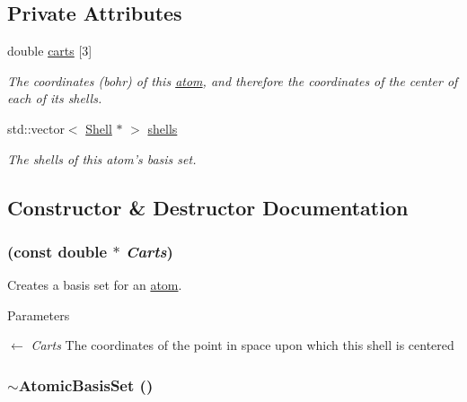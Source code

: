 \subsection*{Private Attributes}
\begin{DoxyCompactItemize}
\item 
double \hyperlink{classJKBuilder_1_1AtomicBasisSet_a6b5adb6f3635311b52c7a7a35dcb01b4}{carts} \mbox{[}3\mbox{]}
\begin{DoxyCompactList}\small\item\em The coordinates (bohr) of this \hyperlink{classJKBuilder_1_1atom}{atom}, and therefore the coordinates of the center of each of its shells. \item\end{DoxyCompactList}\item 
std::vector$<$ \hyperlink{classJKBuilder_1_1Shell}{Shell} $\ast$ $>$ \hyperlink{classJKBuilder_1_1AtomicBasisSet_a26a4de72845629b10ccfa84bf3b27790}{shells}
\begin{DoxyCompactList}\small\item\em The shells of this atom's basis set. \item\end{DoxyCompactList}\end{DoxyCompactItemize}


\subsection{Constructor \& Destructor Documentation}
\hypertarget{classJKBuilder_1_1AtomicBasisSet_aba418bbf95a1242f52a30da3bfd01b8c}{
\subsubsection[{AtomicBasisSet}]{ (const double $\ast$ {\em Carts})}}
\label{classJKBuilder_1_1AtomicBasisSet_aba418bbf95a1242f52a30da3bfd01b8c}


Creates a basis set for an \hyperlink{classJKBuilder_1_1atom}{atom}. 
\begin{DoxyParams}{Parameters}
\item[\mbox{$\leftarrow$} {\em Carts}]The coordinates of the point in space upon which this shell is centered \end{DoxyParams}
\hypertarget{classJKBuilder_1_1AtomicBasisSet_a7c7450d3b14d5416225a628fbdff0a1a}{
\subsubsection[{$\sim$AtomicBasisSet}]{\setlength{\rightskip}{0pt plus 5cm}$\sim${\bf AtomicBasisSet} ()}}
\label{classJKBuilder_1_1AtomicBasisSet_a7c7450d3b14d5416225a628fbdff0a1a}


